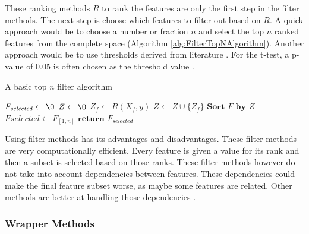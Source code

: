 \documentclass[10pt,a4paper]{report}
\begin{document}
	These ranking methods $R$ to rank the features are only the first step in the filter methods. The next step is choose which features to filter out based on $R$. A quick approach would be to choose a number or fraction $n$ and select the top $n$ ranked features from the complete space (Algorithm \ref{alg:FilterTopNAlgorithm}). Another approach would be to use thresholds derived from literature \cite{donoho2008higher}. For the t-test, a p-value of $0.05$ is often chosen as the threshold value \cite{storey2003statistical, higgins2003measuring}.
	
	\begin{algorithm}[H]
		\caption{A basic top $n$ filter algorithm \cite{Duch2006}}\label{alg:FilterTopNAlgorithm}
		\begin{algorithmic}[1]
			\State $F_{\textit{selected}} \gets \O$ 	
			\State $Z \gets \O$							
			 					
			\State $Z_f \gets R(X_f, y)$ 				 			
			\State $Z \gets Z \cup \{Z_f\}$ 				
			\EndFor
			\State $\textbf{Sort } F \textbf{ by } Z$ 
			\State $F_{}selected \gets F_{[1,n]}$ 
			\State $\textbf{return } F_{\textit{selected}}$
			\EndProcedure
		\end{algorithmic}
	\end{algorithm}	

	
	Using filter methods has its advantages and disadvantages. These filter methods are very computationally efficient. Every feature is given a value for its rank and then a subset is selected based on those ranks. These filter methods however do not take into account dependencies between features. These dependencies could make the final feature subset worse, as maybe some features are related. Other methods are better at handling those dependencies \cite{Duch2006, saeys2007review}.
	
	\subsubsection{Wrapper Methods}
	\label{FSsubsec:WrapperMethods}
	
\end{document}
